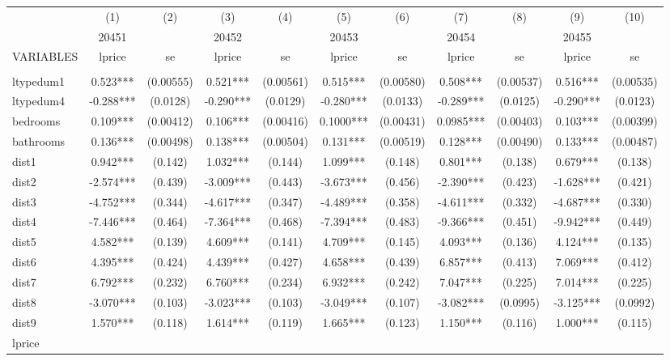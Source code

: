 \documentclass[]{article}
\begin{document}
\begin{tabular}{lcccccccccc} \hline
 & (1) & (2) & (3) & (4) & (5) & (6) & (7) & (8) & (9) & (10) \\
 & 20451 &  & 20452 &  & 20453 &  & 20454 &  & 20455 &  \\
VARIABLES & lprice & se & lprice & se & lprice & se & lprice & se & lprice & se \\ \hline
 &  &  &  &  &  &  &  &  &  &  \\
ltypedum1 & 0.523*** & (0.00555) & 0.521*** & (0.00561) & 0.515*** & (0.00580) & 0.508*** & (0.00537) & 0.516*** & (0.00535) \\
ltypedum4 & -0.288*** & (0.0128) & -0.290*** & (0.0129) & -0.280*** & (0.0133) & -0.289*** & (0.0125) & -0.290*** & (0.0123) \\
bedrooms & 0.109*** & (0.00412) & 0.106*** & (0.00416) & 0.1000*** & (0.00431) & 0.0985*** & (0.00403) & 0.103*** & (0.00399) \\
bathrooms & 0.136*** & (0.00498) & 0.138*** & (0.00504) & 0.131*** & (0.00519) & 0.128*** & (0.00490) & 0.133*** & (0.00487) \\
dist1 & 0.942*** & (0.142) & 1.032*** & (0.144) & 1.099*** & (0.148) & 0.801*** & (0.138) & 0.679*** & (0.138) \\
dist2 & -2.574*** & (0.439) & -3.009*** & (0.443) & -3.673*** & (0.456) & -2.390*** & (0.423) & -1.628*** & (0.421) \\
dist3 & -4.752*** & (0.344) & -4.617*** & (0.347) & -4.489*** & (0.358) & -4.611*** & (0.332) & -4.687*** & (0.330) \\
dist4 & -7.446*** & (0.464) & -7.364*** & (0.468) & -7.394*** & (0.483) & -9.366*** & (0.451) & -9.942*** & (0.449) \\
dist5 & 4.582*** & (0.139) & 4.609*** & (0.141) & 4.709*** & (0.145) & 4.093*** & (0.136) & 4.124*** & (0.135) \\
dist6 & 4.395*** & (0.424) & 4.439*** & (0.427) & 4.658*** & (0.439) & 6.857*** & (0.413) & 7.069*** & (0.412) \\
dist7 & 6.792*** & (0.232) & 6.760*** & (0.234) & 6.932*** & (0.242) & 7.047*** & (0.225) & 7.014*** & (0.225) \\
dist8 & -3.070*** & (0.103) & -3.023*** & (0.103) & -3.049*** & (0.107) & -3.082*** & (0.0995) & -3.125*** & (0.0992) \\
dist9 & 1.570*** & (0.118) & 1.614*** & (0.119) & 1.665*** & (0.123) & 1.150*** & (0.116) & 1.000*** & (0.115) \\
lprice &  &  &  &  &  &  &  &  &  &  \\

\end{tabular}
\end{document}
